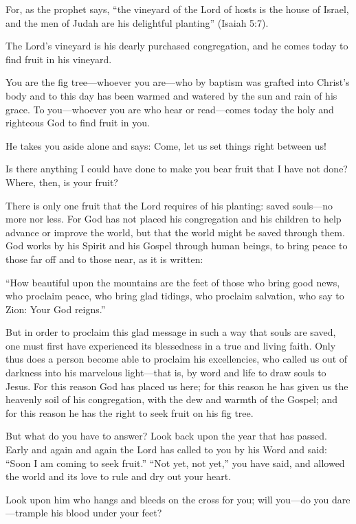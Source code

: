 For, as the prophet says, “the vineyard of the Lord of hosts is the house of Israel, and the men of Judah are his delightful planting” (Isaiah 5:7).

The Lord’s vineyard is his dearly purchased congregation, and he comes today to find fruit in his vineyard.

You are the fig tree—whoever you are—who by baptism was grafted into Christ’s body and to this day has been warmed and watered by the sun and rain of his grace. To you—whoever you are who hear or read—comes today the holy and righteous God to find fruit in you.

He takes you aside alone and says: Come, let us set things right between us!

Is there anything I could have done to make you bear fruit that I have not done? Where, then, is your fruit?

There is only one fruit that the Lord requires of his planting: saved souls—no more nor less. For God has not placed his congregation and his children to help advance or improve the world, but that the world might be saved through them. God works by his Spirit and his Gospel through human beings, to bring peace to those far off and to those near, as it is written:

“How beautiful upon the mountains are the feet of those who bring good news, who proclaim peace, who bring glad tidings, who proclaim salvation, who say to Zion: Your God reigns.”

But in order to proclaim this glad message in such a way that souls are saved, one must first have experienced its blessedness in a true and living faith. Only thus does a person become able to proclaim his excellencies, who called us out of darkness into his marvelous light—that is, by word and life to draw souls to Jesus. For this reason God has placed us here; for this reason he has given us the heavenly soil of his congregation, with the dew and warmth of the Gospel; and for this reason he has the right to seek fruit on his fig tree.

But what do you have to answer? Look back upon the year that has passed. Early and again and again the Lord has called to you by his Word and said: “Soon I am coming to seek fruit.” “Not yet, not yet,” you have said, and allowed the world and its love to rule and dry out your heart.

Look upon him who hangs and bleeds on the cross for you; will you—do you dare—trample his blood under your feet?

